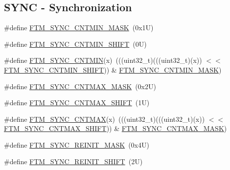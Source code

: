 \subsection*{S\+Y\+NC -\/ Synchronization}
\begin{DoxyCompactItemize}
\item 
\#define \mbox{\hyperlink{group___f_t_m___register___masks_gaee5f107bf44191de4f5e747d4764e3ed}{F\+T\+M\+\_\+\+S\+Y\+N\+C\+\_\+\+C\+N\+T\+M\+I\+N\+\_\+\+M\+A\+SK}}~(0x1\+U)
\item 
\#define \mbox{\hyperlink{group___f_t_m___register___masks_gacdc3ce84e897d0dd03b6ff7c483a6e4f}{F\+T\+M\+\_\+\+S\+Y\+N\+C\+\_\+\+C\+N\+T\+M\+I\+N\+\_\+\+S\+H\+I\+FT}}~(0\+U)
\item 
\#define \mbox{\hyperlink{group___f_t_m___register___masks_ga42673950c5b108f03b504626100ed6ed}{F\+T\+M\+\_\+\+S\+Y\+N\+C\+\_\+\+C\+N\+T\+M\+IN}}(x)~(((uint32\+\_\+t)(((uint32\+\_\+t)(x)) $<$$<$ \mbox{\hyperlink{group___f_t_m___register___masks_gacdc3ce84e897d0dd03b6ff7c483a6e4f}{F\+T\+M\+\_\+\+S\+Y\+N\+C\+\_\+\+C\+N\+T\+M\+I\+N\+\_\+\+S\+H\+I\+FT}})) \& \mbox{\hyperlink{group___f_t_m___register___masks_gaee5f107bf44191de4f5e747d4764e3ed}{F\+T\+M\+\_\+\+S\+Y\+N\+C\+\_\+\+C\+N\+T\+M\+I\+N\+\_\+\+M\+A\+SK}})
\item 
\#define \mbox{\hyperlink{group___f_t_m___register___masks_gae6aedee28d8bdb29e4f4a309e85ccdb0}{F\+T\+M\+\_\+\+S\+Y\+N\+C\+\_\+\+C\+N\+T\+M\+A\+X\+\_\+\+M\+A\+SK}}~(0x2\+U)
\item 
\#define \mbox{\hyperlink{group___f_t_m___register___masks_gad9a59cf6ab219dcb7f646d74e599ddb4}{F\+T\+M\+\_\+\+S\+Y\+N\+C\+\_\+\+C\+N\+T\+M\+A\+X\+\_\+\+S\+H\+I\+FT}}~(1\+U)
\item 
\#define \mbox{\hyperlink{group___f_t_m___register___masks_gaaf2c28c6d25b4cf0cb48d706ccd05f87}{F\+T\+M\+\_\+\+S\+Y\+N\+C\+\_\+\+C\+N\+T\+M\+AX}}(x)~(((uint32\+\_\+t)(((uint32\+\_\+t)(x)) $<$$<$ \mbox{\hyperlink{group___f_t_m___register___masks_gad9a59cf6ab219dcb7f646d74e599ddb4}{F\+T\+M\+\_\+\+S\+Y\+N\+C\+\_\+\+C\+N\+T\+M\+A\+X\+\_\+\+S\+H\+I\+FT}})) \& \mbox{\hyperlink{group___f_t_m___register___masks_gae6aedee28d8bdb29e4f4a309e85ccdb0}{F\+T\+M\+\_\+\+S\+Y\+N\+C\+\_\+\+C\+N\+T\+M\+A\+X\+\_\+\+M\+A\+SK}})
\item 
\#define \mbox{\hyperlink{group___f_t_m___register___masks_gafae9d365874a8b4adc13ccc1a3873b6a}{F\+T\+M\+\_\+\+S\+Y\+N\+C\+\_\+\+R\+E\+I\+N\+I\+T\+\_\+\+M\+A\+SK}}~(0x4\+U)
\item 
\#define \mbox{\hyperlink{group___f_t_m___register___masks_gaf3a51fedf11a10a6793f9df11ca77e87}{F\+T\+M\+\_\+\+S\+Y\+N\+C\+\_\+\+R\+E\+I\+N\+I\+T\+\_\+\+S\+H\+I\+FT}}~(2\+U)

\end{DoxyCompactItemize}
